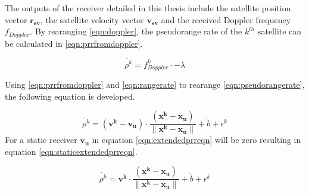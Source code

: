 \documentclass[12pt]{report}
\begin{document}
The outputs of the receiver detailed in this thesis include the satellite position vector $\mathbf{r_{sv}}$, the satellite velocity vector $\mathbf{v_{sv}}$ and the received Doppler frequency $f_{Doppler}$. By rearanging \ref{eqn:doppler}, the pseudorange rate of the $k^{th}$ satellite can be calculated in \ref{eqn:prrfromdoppler}.

\begin{equation}
    \dot{\rho^{k}} = f_{Doppler}^{k} \cdot -\lambda
    \label{eqn:prrfromdoppler}
\end{equation}

Using \ref{eqn:prrfromdoppler} and \ref{eqn:rangerate} to rearange \ref{eqn:pseudorangerate}, the following equation is developed.

\begin{equation}
    \dot{\rho^{k}} = (\mathbf{v^{k}} - \mathbf{v_u}) \cdot \frac{(\mathbf{x^k} - \mathbf{x_u})}{\| \mathbf{x^k} - \mathbf{x_u}\|} + \dot{b} + \epsilon^{k}
    \label{eqn:extendedprreqn}
\end{equation}
For a static receiver $\mathbf{v_u}$ in equation \ref{eqn:extendedprreqn} will be zero resulting in equation \ref{eqn:staticextendedprreqn}.

\begin{equation}
    \dot{\rho^{k}} = \mathbf{v^{k}} \cdot \frac{(\mathbf{x^k} - \mathbf{x_u})}{\| \mathbf{x^k} - \mathbf{x_u}\|} + \dot{b} + \epsilon^{k}
    \label{eqn:staticextendedprreqn}
\end{equation}
\end{document}
